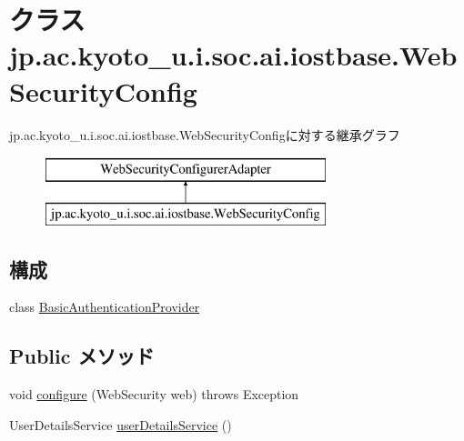 \hypertarget{classjp_1_1ac_1_1kyoto__u_1_1i_1_1soc_1_1ai_1_1iostbase_1_1_web_security_config}{\section{クラス jp.\-ac.\-kyoto\-\_\-u.\-i.\-soc.\-ai.\-iostbase.\-Web\-Security\-Config}
\label{classjp_1_1ac_1_1kyoto__u_1_1i_1_1soc_1_1ai_1_1iostbase_1_1_web_security_config}
}
jp.\-ac.\-kyoto\-\_\-u.\-i.\-soc.\-ai.\-iostbase.\-Web\-Security\-Configに対する継承グラフ\begin{figure}[H]
\begin{center}
\leavevmode
\includegraphics[height=2.000000cm]{classjp_1_1ac_1_1kyoto__u_1_1i_1_1soc_1_1ai_1_1iostbase_1_1_web_security_config}
\end{center}
\end{figure}
\subsection*{構成}
\begin{DoxyCompactItemize}
\item 
class \hyperlink{classjp_1_1ac_1_1kyoto__u_1_1i_1_1soc_1_1ai_1_1iostbase_1_1_web_security_config_1_1_basic_authentication_provider}{Basic\-Authentication\-Provider}
\end{DoxyCompactItemize}
\subsection*{Public メソッド}
\begin{DoxyCompactItemize}
\item 
void \hyperlink{classjp_1_1ac_1_1kyoto__u_1_1i_1_1soc_1_1ai_1_1iostbase_1_1_web_security_config_ab4b1f5d8f510f2a79eed113b2349a05d}{configure} (Web\-Security web)  throws Exception 
\item 
User\-Details\-Service \hyperlink{classjp_1_1ac_1_1kyoto__u_1_1i_1_1soc_1_1ai_1_1iostbase_1_1_web_security_config_ad70bfccaf9abf03eeaee7b7dc4fcec79}{user\-Details\-Service} ()
\end{DoxyCompactItemize}
